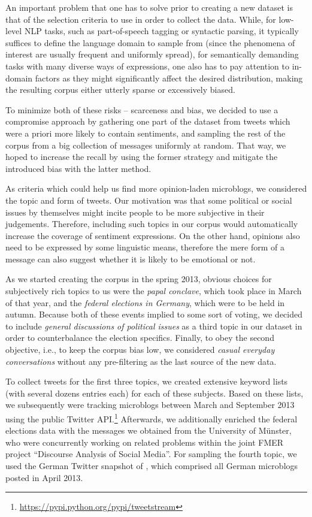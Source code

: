 An important problem that one has to solve prior to creating a new
dataset is that of the selection criteria to use in order to collect
the data.  While, for low-level NLP tasks, such as part-of-speech
tagging or syntactic parsing, it typically suffices to define the
language domain to sample from (since the phenomena of interest are
usually frequent and uniformly spread), for semantically demanding
tasks with many diverse ways of expressions, one also has to pay
attention to in-domain factors as they might significantly affect the
desired distribution, making the resulting corpus either utterly
sparse or excessively biased.

To minimize both of these risks -- scarceness and bias, we decided to
use a compromise approach by gathering one part of the dataset from
tweets which were a priori more likely to contain sentiments, and
sampling the rest of the corpus from a big collection of messages
uniformly at random.  That way, we hoped to increase the recall by
using the former strategy and mitigate the introduced bias with the
latter method.

As criteria which could help us find more opinion-laden microblogs, we
considered the topic and form of tweets.  Our motivation was that some
political or social issues by themselves might incite people to be
more subjective in their judgements.  Therefore, including such topics
in our corpus would automatically increase the coverage of sentiment
expressions.  On the other hand, opinions also need to be expressed by
some linguistic means, therefore the mere form of a message can also
suggest whether it is likely to be emotional or not.

As we started creating the corpus in the spring 2013, obvious choices
for subjectively rich topics to us were the \emph{papal conclave},
which took place in March of that year, and the \emph{federal
  elections in Germany}, which were to be held in autumn.  Because
both of these events implied to some sort of voting, we decided to
include \emph{general discussions of political issues} as a third
topic in our dataset in order to counterbalance the election
specifics.  Finally, to obey the second objective, i.e., to keep the
corpus bias low, we considered \emph{casual everyday conversations}
without any pre-filtering as the last source of the new data.

To collect tweets for the first three topics, we created extensive
keyword lists (with several dozens entries each) for each of these
subjects.  Based on these lists, we subsequently were tracking
microblogs between March and September 2013 using the public Twitter
API.\footnote{\url{https://pypi.python.org/pypi/tweetstream}}
Afterwards, we additionally enriched the federal elections data with
the messages we obtained from the University of M\"unster, who were
concurrently working on related problems within the joint FMER project
``Discourse Analysis of Social Media''.  For sampling the fourth
topic, we used the German Twitter snapshot of \citet{Scheffler:14},
which comprised all German microblogs posted in April 2013.

